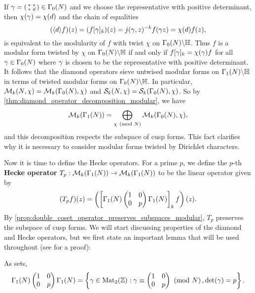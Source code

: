       If $\gamma = \begin{psmallmatrix} \ast & \ast \\ \ast & d \end{psmallmatrix} \in \Gamma_{0}(N)$ and we choose the representative with positive determinant, then $\chi(\gamma) = \chi(d)$ and the chain of equalities
      \[
        (\langle d\rangle f)(z) = (f[\gamma]_{k})(z) = j(\gamma,z)^{-k}f(\gamma z) = \chi(d)f(z),
      \]
      is equivalent to the modularity of $f$ with twist $\chi$ on $\Gamma_{0}(N)\backslash\mathbb{H}$. Thus $f$ is a modular form twisted by $\chi$ on $\Gamma_{0}(N)\backslash\mathbb{H}$ if and only if $f[\gamma]_{k} = \chi(\gamma)f$ for all $\gamma \in \Gamma_{0}(N)$ where $\gamma$ is chosen to be the representative with positive determinant. It follows that the diamond operators sieve untwised modular forms on $\Gamma_{1}(N)\backslash\mathbb{H}$ in terms of twisted modular forms on $\Gamma_{0}(N)\backslash\mathbb{H}$. In particular, $\mathcal{M}_{k}(N,\chi) = \mathcal{M}_{k}(\Gamma_{0}(N),\chi)$ and $\mathcal{S}_{k}(N,\chi) = \mathcal{S}_{k}(\Gamma_{0}(N),\chi)$. So by \cref{thm:diamond_operator_decomposition_modular}, we have
      \[
        \mathcal{M}_{k}(\Gamma_{1}(N)) = \bigoplus_{\chi \ \left(\text{mod }N\right)}\mathcal{M}_{k}(\Gamma_{0}(N),\chi),
      \]
      and this decomposition respects the subspace of cusp forms. This fact clarifies why it is necessary to consider modular forms twisted by Dirichlet characters.
      
      Now it is time to define the Hecke operators. For a prime $p$, we define the $p$-th \textbf{Hecke operator} $T_{p}:\mathcal{M}_{k}(\Gamma_{1}(N)) \to \mathcal{M}_{k}(\Gamma_{1}(N))$ to be the linear operator given by
      \[
        (T_{p}f)(z) = \left(\left[\Gamma_{1}(N)\begin{pmatrix} 1 & 0 \\ 0 & p \end{pmatrix}\Gamma_{1}(N)\right]_{k}f\right)(z).
      \]
      By \cref{prop:double_coset_operator_preserves_subspaces_modular}, $T_{p}$ preserves the subspace of cusp forms. We will start discussing properties of the diamond and Hecke operators, but we first state an important lemma that will be used throughout (see \cite{diamond2005first} for a proof):

      \begin{lemma}\label{lem:cosets_for_Hecek_operators}
        As sets,
        \[
          \Gamma_{1}(N)\begin{pmatrix} 1 & 0 \\ 0 & p \end{pmatrix}\Gamma_{1}(N) = \left\{\gamma \in \mathrm{Mat}_{2}(\mathbb{Z}):\gamma \equiv \begin{pmatrix} 1 & 0 \\ 0 & p \end{pmatrix} \ \left(\text{mod }N\right), \det(\gamma) = p\right\}.
        \]
      \end{lemma}
      
